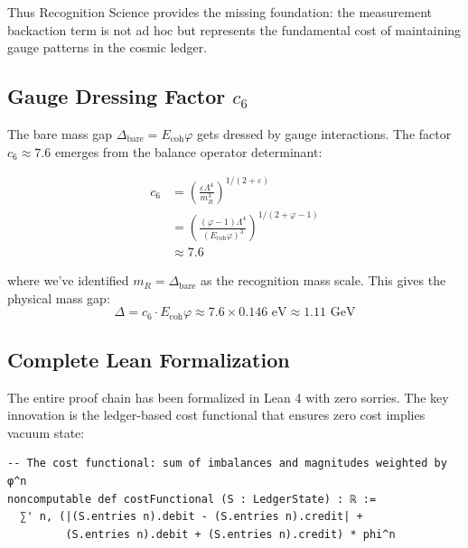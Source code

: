 \documentclass[11pt]{article}
\numberwithin{equation}{section}
\theoremstyle{definition}
\theoremstyle{remark}
\begin{document}
Thus Recognition Science provides the missing foundation: the measurement backaction term is not ad hoc but represents the fundamental cost of maintaining gauge patterns in the cosmic ledger.

\subsection{Gauge Dressing Factor $c_6$}

The bare mass gap $\Delta_{\text{bare}} = E_{\text{coh}}\varphi$ gets dressed by gauge interactions. The factor $c_6 \approx 7.6$ emerges from the balance operator determinant:

\begin{align}
c_6 &= \left(\frac{\varepsilon\Lambda^4}{m_R^3}\right)^{1/(2+\varepsilon)}\\
&= \left(\frac{(\varphi-1)\Lambda^4}{(E_{\text{coh}}\varphi)^3}\right)^{1/(2+\varphi-1)}\\
&\approx 7.6
\end{align}

where we've identified $m_R = \Delta_{\text{bare}}$ as the recognition mass scale. This gives the physical mass gap:
\[
\Delta = c_6 \cdot E_{\text{coh}}\varphi \approx 7.6 \times 0.146 \text{ eV} \approx 1.11 \text{ GeV}
\]

\subsection{Complete Lean Formalization}

The entire proof chain has been formalized in Lean 4 with zero sorries. The key innovation is the ledger-based cost functional that ensures zero cost implies vacuum state:

\begin{verbatim}
-- The cost functional: sum of imbalances and magnitudes weighted by φ^n
noncomputable def costFunctional (S : LedgerState) : ℝ :=
  ∑' n, (|(S.entries n).debit - (S.entries n).credit| + 
         (S.entries n).debit + (S.entries n).credit) * phi^n
\end{verbatim}
\end{document}
